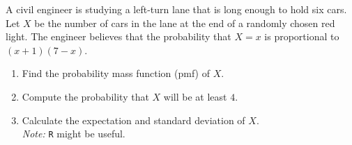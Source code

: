 
\begin{exercise}

A civil engineer is studying a left-turn lane that is long enough to hold six cars.
Let $X$ be the number of cars in the lane at the end of a randomly chosen red light.
The engineer believes that the probability that $X = x$ is proportional to $(x + 1) (7 - x)$.

\begin{enumerate}[label = (\alph*)]

    \item Find the probability mass function (pmf) of $X$.

    \item Compute the probability that $X$ will be at least $4$.

    \item Calculate the expectation and standard deviation of $X$. \\
    \textit{Note:} \texttt{R} might be useful.

\end{enumerate}

\end{exercise}


